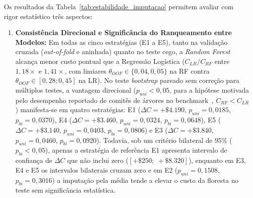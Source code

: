 \documentclass[conference]{IEEEtran}
\begin{document}
Os resultados da Tabela~\ref{tab:estabilidade_imputacao} permitem avaliar com rigor estatístico três aspectos:
\begin{enumerate}
    \item \textbf{Consistência Direcional e Significância do Ranqueamento entre Modelos:} Em todas as cinco estratégias (E1 a E5), tanto na validação cruzada (\textit{out-of-fold} e aninhada) quanto no teste cego, a \textit{Random Forest} alcança menor custo pontual que a Regressão Logística ($C_{LR}/C_{RF}$ entre $1{,}18\times$ e $1{,}41\times$, com limiares $\theta_{OOF} \in \{0{,}04, 0{,}05\}$ na RF contra $\theta_{OOF} \in [0{,}28; 0{,}45]$ na LR). No teste \textit{bootstrap} pareado sem correção para múltiplos testes, a vantagem direcional ($p_{uni} < 0{,}05$, para a hipótese motivada pelo desempenho reportado de comitês de árvores no benchmark~\cite{costa2016ida,gondek2016prediction,rafsunjani2019}, $C_{RF} < C_{LR}$) manifesta-se em quatro estratégias: E1 ($\Delta C = +\$4.190$, $p_{uni} = 0{,}0185$, $p_{bi} = 0{,}0370$), E4 ($\Delta C = +\$3.460$, $p_{uni} = 0{,}0324$, $p_{bi} = 0{,}0648$), E5 ($\Delta C = +\$3.140$, $p_{uni} = 0{,}0403$, $p_{bi} = 0{,}0806$) e E3 ($\Delta C = +\$3.840$, $p_{uni} = 0{,}0460$, $p_{bi} = 0{,}0920$). Todavia, sob um critério bilateral de 95\% ($p_{bi} < 0{,}05$), apenas a estratégia de referência E1 apresenta intervalo de confiança de $\Delta C$ que não inclui zero ($[+\$250;\; +\$8.320]$), enquanto em E3, E4 e E5 os intervalos bilaterais cruzam zero e em E2 ($p_{uni} = 0{,}1508$, $p_{bi} = 0{,}3016$) a imputação pela média tende a elevar o custo da floresta no teste sem significância estatística.

\end{enumerate}
\end{document}
